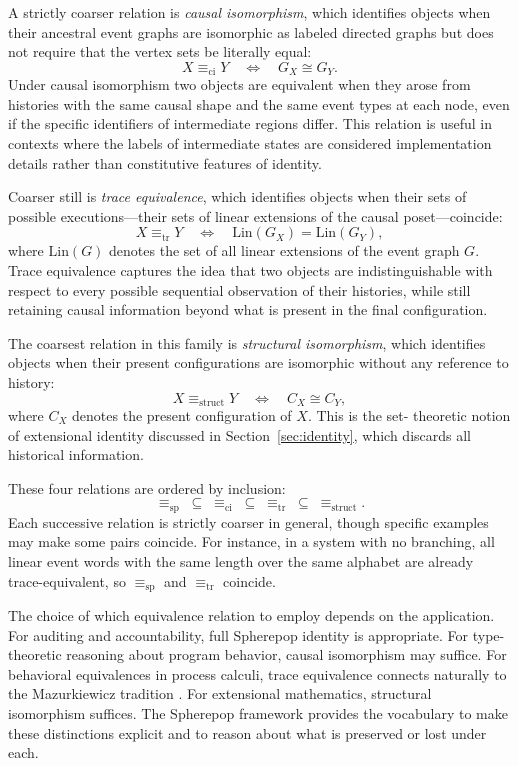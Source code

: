 \documentclass[12pt]{article}
\theoremstyle{plain}
\theoremstyle{definition}
\theoremstyle{remark}
\begin{document}
A strictly coarser relation is \emph{causal isomorphism}, which identifies
objects when their ancestral event graphs are isomorphic as labeled directed
graphs but does not require that the vertex sets be literally equal:
\[
  X \equiv_{\mathrm{ci}} Y
  \quad \Longleftrightarrow \quad
  G_X \cong G_Y.
\]
Under causal isomorphism two objects are equivalent when they arose from
histories with the same causal shape and the same event types at each node,
even if the specific identifiers of intermediate regions differ.  This relation
is useful in contexts where the labels of intermediate states are considered
implementation details rather than constitutive features of identity.

Coarser still is \emph{trace equivalence}, which identifies objects when their
sets of possible executions---their sets of linear extensions of the causal
poset---coincide:
\[
  X \equiv_{\mathrm{tr}} Y
  \quad \Longleftrightarrow \quad
  \mathrm{Lin}(G_X) = \mathrm{Lin}(G_Y),
\]
where $\mathrm{Lin}(G)$ denotes the set of all linear extensions of the
event graph $G$.  Trace equivalence captures the idea that two objects are
indistinguishable with respect to every possible sequential observation of
their histories, while still retaining causal information beyond what is
present in the final configuration.

The coarsest relation in this family is \emph{structural isomorphism}, which
identifies objects when their present configurations are isomorphic without
any reference to history:
\[
  X \equiv_{\mathrm{struct}} Y
  \quad \Longleftrightarrow \quad
  C_X \cong C_Y,
\]
where $C_X$ denotes the present configuration of $X$.  This is the set-
theoretic notion of extensional identity discussed in Section~\ref{sec:identity},
which discards all historical information.

These four relations are ordered by inclusion:
\[
  \equiv_{\mathrm{sp}} \;\subseteq\; \equiv_{\mathrm{ci}}
  \;\subseteq\; \equiv_{\mathrm{tr}} \;\subseteq\; \equiv_{\mathrm{struct}}.
\]
Each successive relation is strictly coarser in general, though specific
examples may make some pairs coincide.  For instance, in a system with no
branching, all linear event words with the same length over the same alphabet
are already trace-equivalent, so $\equiv_{\mathrm{sp}}$ and $\equiv_{\mathrm{tr}}$
coincide.

The choice of which equivalence relation to employ depends on the application.
For auditing and accountability, full Spherepop identity is appropriate.
For type-theoretic reasoning about program behavior, causal isomorphism may
suffice.  For behavioral equivalences in process calculi, trace equivalence
connects naturally to the Mazurkiewicz tradition \citep{Mazurkiewicz1987}.
For extensional mathematics, structural isomorphism suffices.  The Spherepop
framework provides the vocabulary to make these distinctions explicit and to
reason about what is preserved or lost under each.
\end{document}

